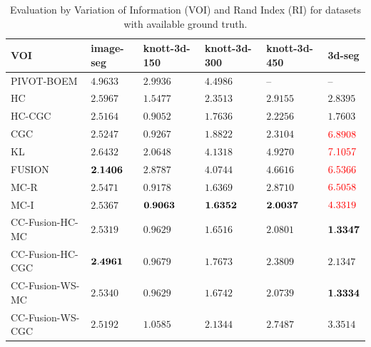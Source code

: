 \documentclass[10pt,twocolumn,letterpaper]{article}
\theoremstyle{definition}
\newcommand{\rd}{\color{red}}
\begin{document}
\begin{table}[t]
   \tiny
   \centering
   \caption{Evaluation by Variation of Information (VOI) and Rand Index (RI) for datasets with available ground truth.}
   \label{tab:eval}
   \vspace{-0.1cm}
   \begin{tabular}{llllll}
      \toprule
         VOI              &  image-seg   & knott-3d-150 & knott-3d-300   & knott-3d-450 &3d-seg\\
      \midrule 
         PIVOT-BOEM       &\rd$ 4.9633$  &\rd $ 2.9936$ &\rd $ 4.4986$   &      --       &  --\\ 
         HC               &   $ 2.5967$  &    $ 1.5477$ &    $ 2.3513$   &    $ 2.9155$  & $       2.8395$\\
         HC-CGC           &   $ 2.5164$  &    $ 0.9052$ &    $ 1.7636$   &    $ 2.2256$  & $       1.7603$ \\
         CGC              &   $ 2.5247$  &    $ 0.9267$ &    $ 1.8822$   &    $ 2.3104$  & $\rd    6.8908$ \\
         KL               &   $ 2.6432$  &\rd $ 2.0648$ &\rd $ 4.1318$   &\rd $ 4.9270$  & $\rd    7.1057$\\
         FUSION           &$\bf 2.1406$  &\rd $ 2.8787$ &\rd $ 4.0744$   &\rd $ 4.6616$  & $\rd    6.5366$ \\
         MC-R             &   $ 2.5471$  &    $ 0.9178$ &    $ 1.6369$   &    $ 2.8710$  & $\rd    6.5058$\\   
         MC-I             &   $ 2.5367$  & $\bf 0.9063$ & $\bf 1.6352$   & $\bf 2.0037$  & $\rd    4.3319$\\  
         CC-Fusion-HC-MC   &   $ 2.5319$  &    $ 0.9629$ &    $ 1.6516$   &    $ 2.0801$ & $\bf    1.3347$ \\  
         CC-Fusion-HC-CGC  &$\bf 2.4961$  &    $ 0.9679$ &    $ 1.7673$   &    $ 2.3809$ & $       2.1347$ \\  
         CC-Fusion-WS-MC   &   $ 2.5340$  &    $ 0.9629$ &    $ 1.6742$   &    $ 2.0739$ & $\bf    1.3334$ \\  
         CC-Fusion-WS-CGC  &   $ 2.5192$  &    $ 1.0585$ &    $ 2.1344$   &    $ 2.7487$ & $       3.3514$ \\      
      \bottomrule
   \end{tabular}


\end{table}
\end{document}
